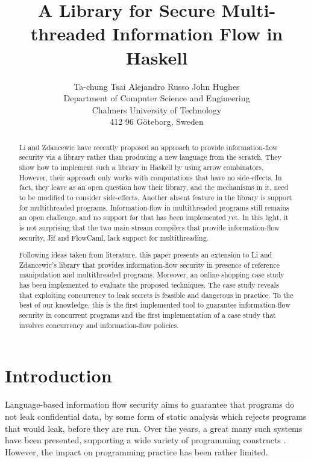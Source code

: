 \documentclass[times, 10pt,twocolumn]{article}
\begin{document}
\title{A Library for Secure Multi-threaded Information Flow in Haskell}
\author{Ta-chung Tsai \qquad Alejandro Russo \qquad John Hughes \\
Department of Computer Science and Engineering\\
Chalmers University of Technology\\
412 96 G\"{o}teborg, Sweden
}


\maketitle


\begin{abstract}
Li and Zdancewic have recently proposed an approach  
to provide information-flow security via a library rather 
than producing a new language from the scratch. They show how to 
implement such a library in Haskell by using arrow combinators.
However, their approach only 
works with computations that have no side-effects. In fact, they 
leave as an open question how their library, and the mechanisms 
in it, need to be modified to consider side-effects. Another 
absent feature in the library is support for multithreaded 
programs. Information-flow in multithreaded programs still remains
an open challenge, and no support for that has been implemented 
yet. In this light, it is not surprising that the two main stream 
compilers that provide information-flow security, Jif and FlowCaml, 
lack support for multithreading. 

Following ideas taken from literature, this paper presents an extension 
to Li and Zdancewic's library that provides information-flow security in
presence of reference manipulation and multithreaded programs. 
Moreover, an online-shopping case study has been implemented to evaluate the proposed
techniques. The case study reveals that exploiting concurrency to
leak secrets is feasible and dangerous in practice. 
To the best of our knowledge, this is the first implemented tool to guarantee 
information-flow security in concurrent programs and the first implementation
of a case study that involves concurrency and information-flow policies. 
\end{abstract}


\section{Introduction}

Language-based information flow security aims to guarantee that
programs do not leak confidential data, by some form of static
analysis which rejects programs that would leak, before they are run.
Over the years, a great many such systems have been presented,
supporting a wide variety of programming constructs
\cite{Sabelfeld:Myers:JSAC}. However, the impact on programming
practice has been rather limited.
\end{document}
